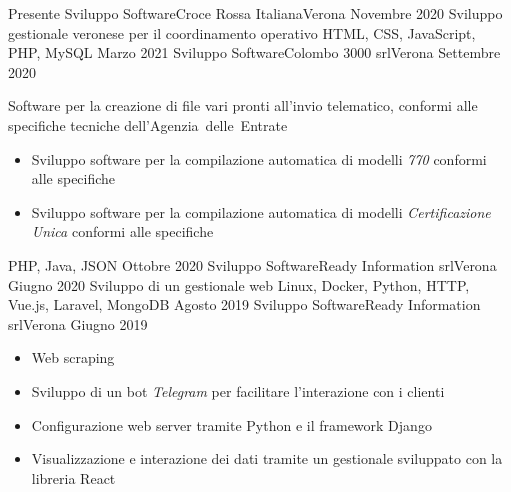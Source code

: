 %
%
%


\begin{experiences}
  \experience
  {Presente}    {Sviluppo Software}{Croce Rossa Italiana}{Verona}
  {Novembre 2020}
                    {
                      Sviluppo gestionale veronese per il coordinamento operativo
                    }
                    {HTML, CSS, JavaScript, PHP, MySQL}
  \emptySeparator
  \experience
  {Marzo 2021}    {Sviluppo Software}{Colombo 3000 srl}{Verona}
  {Settembre 2020}
                    {
                      Software per la creazione di file vari pronti all'invio telematico, conformi alle specifiche tecniche \mbox{dell'Agenzia delle Entrate}
                      \begin{itemize}
                        \item Sviluppo software per la compilazione automatica di modelli \emph{770} conformi alle specifiche
                        \item Sviluppo software per la compilazione automatica di modelli \emph{Certificazione Unica} conformi alle specifiche
                      \end{itemize}
                    }
                    {PHP, Java, JSON}
  \emptySeparator
  \experience
  {Ottobre 2020}      {Sviluppo Software}{Ready Information srl}{Verona}
  {Giugno 2020}
                    {
                      Sviluppo di un gestionale web
                    }
                    {Linux, Docker, Python, HTTP, Vue.js, Laravel, MongoDB} 
  \emptySeparator   
  \experience
  {Agosto 2019}       {Sviluppo Software}{Ready Information srl}{Verona}
  {Giugno 2019}
                    {
                      \begin{itemize}
                        \item Web scraping
                        \item Sviluppo di un bot \emph{Telegram} per facilitare l'interazione con i clienti
                        \item Configurazione web server tramite Python e il framework Django
                        \item Visualizzazione e interazione dei dati tramite un gestionale sviluppato con la libreria React

\end{itemize}}
\end{experiences}
